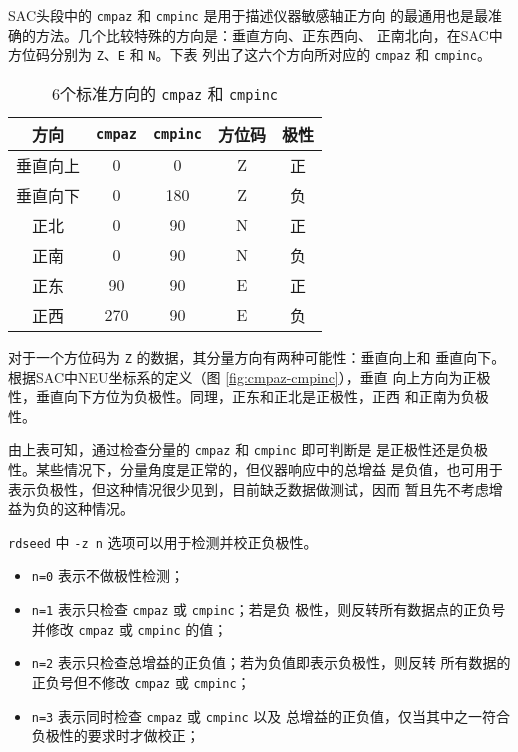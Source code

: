 SAC头段中的 \texttt{cmpaz} 和 \texttt{cmpinc} 是用于描述仪器敏感轴正方向
的最通用也是最准确的方法。几个比较特殊的方向是：垂直方向、正东西向、
正南北向，在SAC中方位码分别为 \texttt{Z}、\texttt{E} 和 \texttt{N}。下表
列出了这六个方向所对应的 \texttt{cmpaz} 和 \texttt{cmpinc}。
\begin{table}[H]
\caption{6个标准方向的 \texttt{cmpaz} 和 \texttt{cmpinc}}
\label{table:six-cmpaz-cmpinc}
\centering
\begin{tabular}{ccccc}
\toprule
方向     &   \texttt{cmpaz} & \texttt{cmpinc}  & 方位码 & 极性  \\
\midrule
垂直向上 &   0              &  0               & Z      & 正    \\
垂直向下 &   0              &  180             & Z      & 负    \\
正北     &   0              &  90              & N      & 正    \\
正南     &   0              &  90              & N      & 负    \\
正东     &   90             &  90              & E      & 正    \\
正西     &   270            &  90              & E      & 负    \\
\bottomrule
\end{tabular}
\end{table}

对于一个方位码为 \texttt{Z} 的数据，其分量方向有两种可能性：垂直向上和
垂直向下。根据SAC中NEU坐标系的定义（图 \ref{fig:cmpaz-cmpinc}），垂直
向上方向为正极性，垂直向下方位为负极性。同理，正东和正北是正极性，正西
和正南为负极性。

由上表可知，通过检查分量的 \texttt{cmpaz} 和 \texttt{cmpinc} 即可判断是
是正极性还是负极性。某些情况下，分量角度是正常的，但仪器响应中的总增益
是负值，也可用于表示负极性，但这种情况很少见到，目前缺乏数据做测试，因而
暂且先不考虑增益为负的这种情况。

\texttt{rdseed} 中 \texttt{-z n} 选项可以用于检测并校正负极性。
\begin{itemize}
\item \texttt{n=0} 表示不做极性检测；
\item \texttt{n=1} 表示只检查 \texttt{cmpaz} 或 \texttt{cmpinc}；若是负
    极性，则反转所有数据点的正负号并修改 \texttt{cmpaz} 或 \texttt{cmpinc}
    的值；
\item \texttt{n=2} 表示只检查总增益的正负值；若为负值即表示负极性，则反转
    所有数据的正负号但不修改 \texttt{cmpaz} 或 \texttt{cmpinc}；
\item \texttt{n=3} 表示同时检查 \texttt{cmpaz} 或 \texttt{cmpinc} 以及
    总增益的正负值，仅当其中之一符合负极性的要求时才做校正；
\end{itemize}

